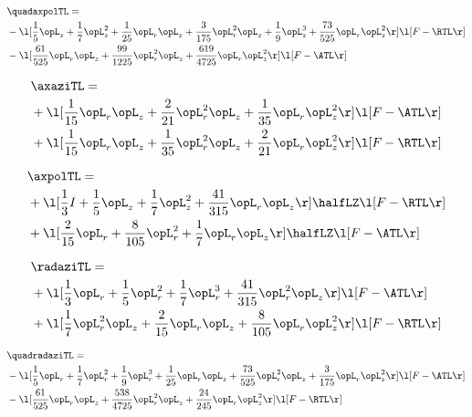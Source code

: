 \begin{alignat}{2} 
\label{eq:quadaxpolTL_2} 
& \quadaxpolTL = \\ 
& - \l[ \frac{1}{5} \opL_z + \frac{1}{7} \opL_z^{2} + \frac{1}{25} \opL_r \opL_z + \frac{3}{175} \opL_r^{2} \opL_z + \frac{1}{9} \opL_z^{3} + \frac{73}{525} \opL_r \opL_z^{2}  \r] \l[ F - \RTL \r] \nonumber \\ 
& - \l[ \frac{61}{525} \opL_r \opL_z + \frac{99}{1225} \opL_r^{2} \opL_z + \frac{619}{4725} \opL_r \opL_z^{2}  \r] \l[ F - \ATL \r] \nonumber \\ 
\end{alignat} 


\begin{alignat}{2} 
\label{eq:linaxaziTL_2} 
& \axaziTL = \\ 
& + \l[ \frac{1}{15} \opL_r \opL_z + \frac{2}{21} \opL_r^{2} \opL_z + \frac{1}{35} \opL_r \opL_z^{2}  \r] \l[ F - \ATL \r] \nonumber \\ 
& + \l[ \frac{1}{15} \opL_r \opL_z + \frac{1}{35} \opL_r^{2} \opL_z + \frac{2}{21} \opL_r \opL_z^{2}  \r] \l[ F - \RTL \r] \nonumber \\ 
\end{alignat} 


\begin{alignat}{2} 
\label{eq:linaxpolTL_2} 
& \axpolTL = \\ 
& + \l[ \frac{1}{3} I + \frac{1}{5} \opL_z + \frac{1}{7} \opL_z^{2} + \frac{41}{315} \opL_r \opL_z  \r] \halfLZ \l[ F - \RTL \r] \nonumber \\ 
& + \l[ \frac{2}{15} \opL_r + \frac{8}{105} \opL_r^{2} + \frac{1}{7} \opL_r \opL_z  \r] \halfLZ \l[ F - \ATL \r] \nonumber \\ 
\end{alignat} 


\begin{alignat}{2} 
\label{eq:linradaziTL_1} 
& \radaziTL = \\ 
& + \l[ \frac{1}{3} \opL_r + \frac{1}{5} \opL_r^{2} + \frac{1}{7} \opL_r^{3} + \frac{41}{315} \opL_r^{2} \opL_z  \r] \l[ F - \ATL \r] \nonumber \\ 
& + \l[ \frac{1}{7} \opL_r^{2} \opL_z + \frac{2}{15} \opL_r \opL_z + \frac{8}{105} \opL_r \opL_z^{2}  \r] \l[ F - \RTL \r] \nonumber \\ 
\end{alignat} 


\begin{alignat}{2} 
\label{eq:quadradaziTL_1} 
& \quadradaziTL = \\ 
& - \l[ \frac{1}{5} \opL_r + \frac{1}{7} \opL_r^{2} + \frac{1}{9} \opL_r^{3} + \frac{1}{25} \opL_r \opL_z + \frac{73}{525} \opL_r^{2} \opL_z + \frac{3}{175} \opL_r \opL_z^{2}  \r] \l[ F - \ATL \r] \nonumber \\ 
& - \l[ \frac{61}{525} \opL_r \opL_z + \frac{538}{4725} \opL_r^{2} \opL_z + \frac{24}{245} \opL_r \opL_z^{2}  \r] \l[ F - \RTL \r] \nonumber \\ 
\end{alignat} 


